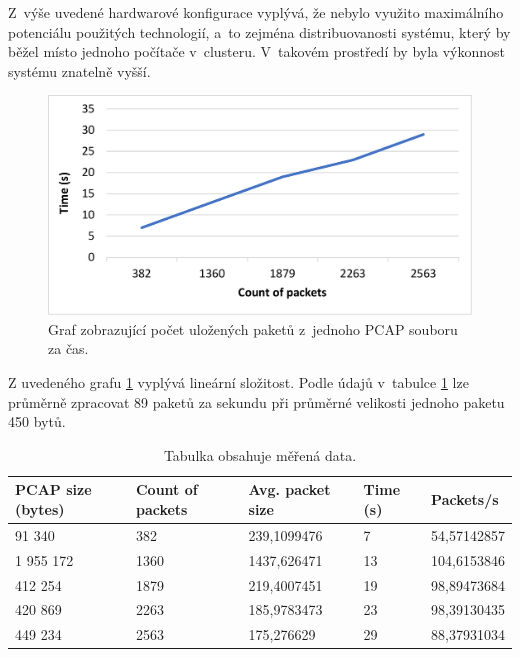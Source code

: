 Z~výše uvedené hardwarové konfigurace vyplývá, že nebylo využito maximálního potenciálu použitých technologií, a~to zejména distribuovanosti systému, který by běžel místo jednoho počítače v~clusteru. V~takovém prostředí by byla výkonnost systému znatelně vyšší.

\begin{figure}[!h]
  \centering
  \includegraphics[width=15cm]{template-fig/PerformanceChart.pdf}
  \caption{Graf zobrazující počet uložených paketů z~jednoho PCAP souboru za čas.}
  \label{FIG_PerformanceChart}
\end{figure}

\vspace{0.5cm}

\noindent Z uvedeného grafu \ref{FIG_PerformanceChart} vyplývá lineární složitost. Podle údajů v~tabulce \ref{TablePerformance} lze průměrně zpracovat 89 paketů za sekundu při průměrné velikosti jednoho paketu 450 bytů.



\vspace{0.5cm}

\begin{table}[h!]
    \centering
    \begin{tabular}{| l | l | l | l | l |}
    \hline
    PCAP size (bytes)   &   Count of packets   &   Avg. packet size &  Time (s) &   Packets/s \\ \hline
    91 340 & 382 & 239,1099476 & 7 & 54,57142857 \\ \hline
    1 955 172 & 1360 & 1437,626471 & 13 & 104,6153846 \\ \hline
    412 254 & 1879 & 219,4007451 & 19 & 98,89473684 \\ \hline
    420 869 & 2263 & 185,9783473 & 23 & 98,39130435 \\ \hline
    449 234 & 2563 & 175,276629 & 29 & 88,37931034 \\ \hline
    \end{tabular}\par
    \bigskip
    \caption{Tabulka obsahuje měřená data.}
    \label{TablePerformance}
\end{table}

